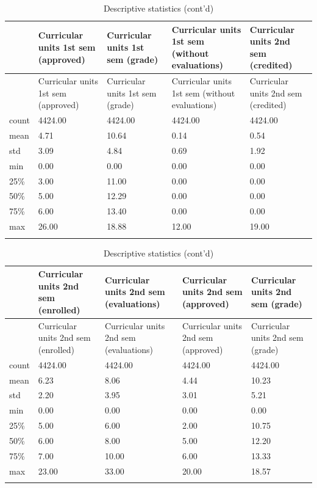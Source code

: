 \documentclass[
  letterpaper,
  DIV=11,
  numbers=noendperiod]{scrartcl}
\begin{document}
\hypertarget{tab-descstat-6}{}
\begin{longtable}[]{@{}lllll@{}}
\toprule\noalign{}
& Curricular units 1st sem (approved) & Curricular units 1st sem (grade)
& Curricular units 1st sem (without evaluations) & Curricular units 2nd
sem (credited) \\
\midrule\noalign{}
\endfirsthead
\toprule\noalign{}
& Curricular units 1st sem (approved) & Curricular units 1st sem (grade)
& Curricular units 1st sem (without evaluations) & Curricular units 2nd
sem (credited) \\
\midrule\noalign{}
\endhead
\bottomrule\noalign{}
\endlastfoot
count & 4424.00 & 4424.00 & 4424.00 & 4424.00 \\
mean & 4.71 & 10.64 & 0.14 & 0.54 \\
std & 3.09 & 4.84 & 0.69 & 1.92 \\
min & 0.00 & 0.00 & 0.00 & 0.00 \\
25\% & 3.00 & 11.00 & 0.00 & 0.00 \\
50\% & 5.00 & 12.29 & 0.00 & 0.00 \\
75\% & 6.00 & 13.40 & 0.00 & 0.00 \\
max & 26.00 & 18.88 & 12.00 & 19.00 \\
\caption{Descriptive statistics (cont'd) }\tabularnewline
\end{longtable}

\hypertarget{tab-descstat-7}{}
\begin{longtable}[]{@{}lllll@{}}
\toprule\noalign{}
& Curricular units 2nd sem (enrolled) & Curricular units 2nd sem
(evaluations) & Curricular units 2nd sem (approved) & Curricular units
2nd sem (grade) \\
\midrule\noalign{}
\endfirsthead
\toprule\noalign{}
& Curricular units 2nd sem (enrolled) & Curricular units 2nd sem
(evaluations) & Curricular units 2nd sem (approved) & Curricular units
2nd sem (grade) \\
\midrule\noalign{}
\endhead
\bottomrule\noalign{}
\endlastfoot
count & 4424.00 & 4424.00 & 4424.00 & 4424.00 \\
mean & 6.23 & 8.06 & 4.44 & 10.23 \\
std & 2.20 & 3.95 & 3.01 & 5.21 \\
min & 0.00 & 0.00 & 0.00 & 0.00 \\
25\% & 5.00 & 6.00 & 2.00 & 10.75 \\
50\% & 6.00 & 8.00 & 5.00 & 12.20 \\
75\% & 7.00 & 10.00 & 6.00 & 13.33 \\
max & 23.00 & 33.00 & 20.00 & 18.57 \\
\caption{Descriptive statistics (cont'd) }\tabularnewline
\end{longtable}
\end{document}
